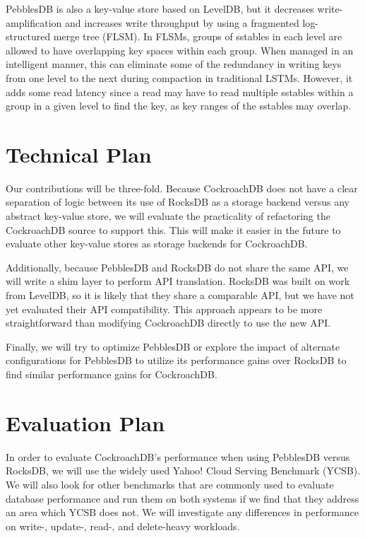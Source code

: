 \documentclass[10pt,twocolumn,letterpaper]{article}
\begin{document}
PebblesDB is also a key-value store based on LevelDB, but it decreases
write-amplification and increases write throughput by using a fragmented
log-structured merge tree (FLSM). In FLSMs, groups of sstables in each level
are allowed to have overlapping key spaces within each group. When managed in
an intelligent manner, this can eliminate some of the redundancy in writing
keys from one level to the next during compaction in traditional LSTMs.
However, it adds some read latency since a read may have to read multiple
sstables within a group in a given level to find the key, as key ranges of the
sstables may overlap.


\section{Technical Plan}
Our contributions will be three-fold. Because CockroachDB does not have a clear
separation of logic between its use of RocksDB as a storage backend versus any
abstract key-value store, we will evaluate the practicality of refactoring the
CockroachDB source to support this. This will make it easier in the future to
evaluate other key-value stores as storage backends for CockroachDB.

Additionally, because PebblesDB and RocksDB do not share the same API, we will
write a shim layer to perform API translation. RocksDB was built on work from
LevelDB, so it is likely that they share a comparable API, but we have not yet
evaluated their API compatibility.  This approach appears to be more
straightforward than modifying CockroachDB directly to use the new API.

Finally, we will try to optimize PebblesDB or explore the impact of alternate
configurations for PebblesDB to utilize its performance gains over RocksDB to
find similar performance gains for CockroachDB.


\section{Evaluation Plan}
In order to evaluate CockroachDB's performance when using PebblesDB versus
RocksDB, we will use the widely used Yahoo! Cloud Serving Benchmark (YCSB). We
will also look for other benchmarks that are commonly used to evaluate database
performance and run them on both systems if we find that they address an area
which YCSB does not. We will investigate any differences in performance on
write-, update-, read-, and delete-heavy workloads.
\end{document}
